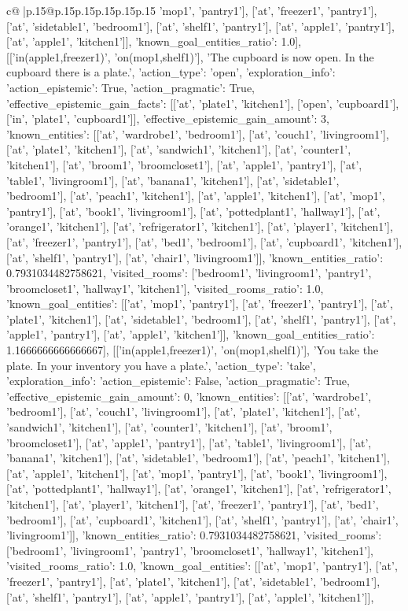 \documentclass{article}
\begin{document}
{\begin{supertabular}{c@{$\;$}|p{.15\linewidth}@{}p{.15\linewidth}p{.15\linewidth}p{.15\linewidth}p{.15\linewidth}p{.15\linewidth}}
{{{'mop1', 'pantry1'], ['at', 'freezer1', 'pantry1'], ['at', 'sidetable1', 'bedroom1'], ['at', 'shelf1', 'pantry1'], ['at', 'apple1', 'pantry1'], ['at', 'apple1', 'kitchen1']], 'known_goal_entities_ratio': 1.0}}], [['in(apple1,freezer1)', 'on(mop1,shelf1)'], 'The cupboard is now open. In the cupboard there is a plate.', {'action_type': 'open', 'exploration_info': {'action_epistemic': True, 'action_pragmatic': True, 'effective_epistemic_gain_facts': [['at', 'plate1', 'kitchen1'], ['open', 'cupboard1'], ['in', 'plate1', 'cupboard1']], 'effective_epistemic_gain_amount': 3, 'known_entities': [['at', 'wardrobe1', 'bedroom1'], ['at', 'couch1', 'livingroom1'], ['at', 'plate1', 'kitchen1'], ['at', 'sandwich1', 'kitchen1'], ['at', 'counter1', 'kitchen1'], ['at', 'broom1', 'broomcloset1'], ['at', 'apple1', 'pantry1'], ['at', 'table1', 'livingroom1'], ['at', 'banana1', 'kitchen1'], ['at', 'sidetable1', 'bedroom1'], ['at', 'peach1', 'kitchen1'], ['at', 'apple1', 'kitchen1'], ['at', 'mop1', 'pantry1'], ['at', 'book1', 'livingroom1'], ['at', 'pottedplant1', 'hallway1'], ['at', 'orange1', 'kitchen1'], ['at', 'refrigerator1', 'kitchen1'], ['at', 'player1', 'kitchen1'], ['at', 'freezer1', 'pantry1'], ['at', 'bed1', 'bedroom1'], ['at', 'cupboard1', 'kitchen1'], ['at', 'shelf1', 'pantry1'], ['at', 'chair1', 'livingroom1']], 'known_entities_ratio': 0.7931034482758621, 'visited_rooms': ['bedroom1', 'livingroom1', 'pantry1', 'broomcloset1', 'hallway1', 'kitchen1'], 'visited_rooms_ratio': 1.0, 'known_goal_entities': [['at', 'mop1', 'pantry1'], ['at', 'freezer1', 'pantry1'], ['at', 'plate1', 'kitchen1'], ['at', 'sidetable1', 'bedroom1'], ['at', 'shelf1', 'pantry1'], ['at', 'apple1', 'pantry1'], ['at', 'apple1', 'kitchen1']], 'known_goal_entities_ratio': 1.1666666666666667}}], [['in(apple1,freezer1)', 'on(mop1,shelf1)'], 'You take the plate. In your inventory you have a plate.', {'action_type': 'take', 'exploration_info': {'action_epistemic': False, 'action_pragmatic': True, 'effective_epistemic_gain_amount': 0, 'known_entities': [['at', 'wardrobe1', 'bedroom1'], ['at', 'couch1', 'livingroom1'], ['at', 'plate1', 'kitchen1'], ['at', 'sandwich1', 'kitchen1'], ['at', 'counter1', 'kitchen1'], ['at', 'broom1', 'broomcloset1'], ['at', 'apple1', 'pantry1'], ['at', 'table1', 'livingroom1'], ['at', 'banana1', 'kitchen1'], ['at', 'sidetable1', 'bedroom1'], ['at', 'peach1', 'kitchen1'], ['at', 'apple1', 'kitchen1'], ['at', 'mop1', 'pantry1'], ['at', 'book1', 'livingroom1'], ['at', 'pottedplant1', 'hallway1'], ['at', 'orange1', 'kitchen1'], ['at', 'refrigerator1', 'kitchen1'], ['at', 'player1', 'kitchen1'], ['at', 'freezer1', 'pantry1'], ['at', 'bed1', 'bedroom1'], ['at', 'cupboard1', 'kitchen1'], ['at', 'shelf1', 'pantry1'], ['at', 'chair1', 'livingroom1']], 'known_entities_ratio': 0.7931034482758621, 'visited_rooms': ['bedroom1', 'livingroom1', 'pantry1', 'broomcloset1', 'hallway1', 'kitchen1'], 'visited_rooms_ratio': 1.0, 'known_goal_entities': [['at', 'mop1', 'pantry1'], ['at', 'freezer1', 'pantry1'], ['at', 'plate1', 'kitchen1'], ['at', 'sidetable1', 'bedroom1'], ['at', 'shelf1', 'pantry1'], ['at', 'apple1', 'pantry1'], ['at', 'apple1', 'kitchen1']], }}}
\end{supertabular}}
\end{document}
